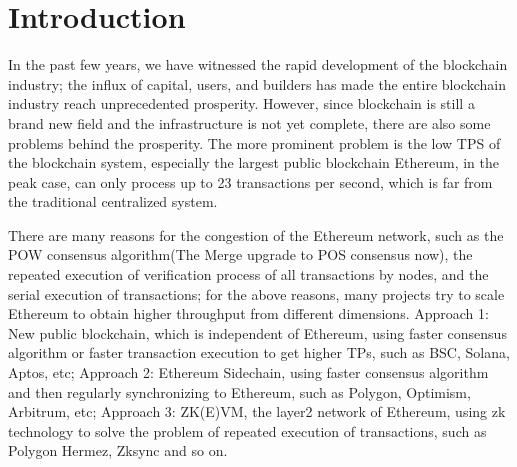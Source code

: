\section{Introduction}\label{sec:introduction}

In the past few years, we have witnessed the rapid development of the blockchain industry; 
the influx of capital, users, and builders has made the entire blockchain industry reach 
unprecedented prosperity. However, since blockchain is still a brand new field and the
infrastructure is not yet complete, there are also some problems behind the prosperity. 
The more prominent problem is the low TPS of the blockchain system, especially the largest public
blockchain Ethereum\cite{website:Ethereum}, in the peak case\cite{website:Etherscan-chart}, can only process up to 23 
transactions per second, which is far from the traditional centralized system. 

There are many reasons for the congestion of the Ethereum\cite{website:Ethereum} network, such as the POW\cite{website:POW} 
consensus algorithm(The Merge upgrade\cite{website:The-Merge} to POS\cite{website:POS} consensus now), the repeated execution of 
verification process of all transactions by nodes, and the serial execution of transactions; 
for the above reasons, many projects try to scale Ethereum to obtain higher throughput from different dimensions. Approach 1: New public blockchain, 
which is independent of Ethereum\cite{website:Ethereum}, 
using faster consensus algorithm or faster transaction execution to get higher TPs, such as BSC\cite{website:BSC}, Solana\cite{website:Solana}, 
Aptos\cite{website:Aptos}, etc; Approach 2: Ethereum\cite{website:Ethereum} Sidechain, using faster consensus
algorithm and then regularly synchronizing to Ethereum\cite{website:Ethereum}, such as Polygon\cite{website:Polygon}, Optimism\cite{website:Optimism}, Arbitrum\cite{website:Arbitrum},
etc; Approach 3: ZK(E)VM, the layer2 network of Ethereum\cite{website:Ethereum}, using zk technology to 
solve the problem of repeated execution of transactions, such as Polygon Hermez\cite{website:Polygon-Hermez}, 
Zksync\cite{website:Zksync} and so on.

